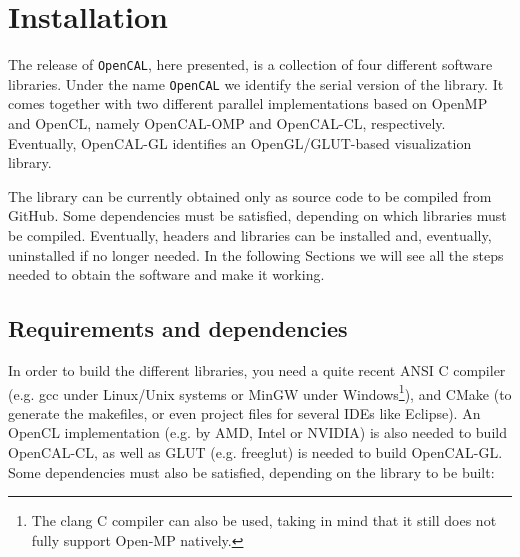\chapter{Installation} \label{ch:installation}

The release of \verb'OpenCAL', here presented, is a collection of four
different software libraries. Under the name \verb'OpenCAL' we
identify the serial version of the library. It comes together with two
different parallel implementations based on OpenMP and OpenCL, namely
OpenCAL-OMP and OpenCAL-CL, respectively. Eventually, OpenCAL-GL
identifies an OpenGL/GLUT-based visualization library.

The library can be currently obtained only as source code to be
compiled from GitHub. Some dependencies must be satisfied, depending
on which libraries must be compiled. Eventually, headers and libraries
can be installed and, eventually, uninstalled if no longer needed. In
the following Sections we will see all the steps needed to obtain the
software and make it working.

\section{Requirements and dependencies}

In order to build the different libraries, you need a quite recent
ANSI C compiler (e.g. gcc under Linux/Unix systems or MinGW under
Windows\footnote{The clang C compiler can also be used, taking in mind
  that it still does not fully support Open-MP natively.}), and CMake
(to generate the makefiles, or even project files for several IDEs
like Eclipse). An OpenCL implementation (e.g. by AMD, Intel or NVIDIA)
is also needed to build OpenCAL-CL, as well as GLUT (e.g. freeglut) is
needed to build OpenCAL-GL. Some dependencies must also be satisfied,
depending on the library to be built:



